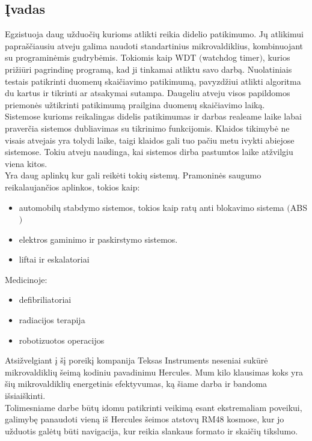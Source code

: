 \documentclass[a4paper, 12pt]{article} %
\begin{document}
\begin{onehalfspacing}

\section*{\k{I}vadas} %


Egzistuoja daug u\v{z}duo\v{c}i\k{u} kurioms atlikti reikia didelio patikimumo. J\k{u} atlikimui papra\v{s}\v{c}iausiu atveju galima naudoti standartinius mikrovaldiklius, kombinuojant su programin\.emis gudryb\.emis. Tokiomis kaip WDT $($watchdog timer$)$, kurios pri\v{z}i\=uri pagrindin\k{e} program\k{a}, kad ji tinkamai atliktu savo darb\k{a}. Nuolatiniais testais patikrinti duomen\k{u} skai\v{c}iavimo patikimum\k{a}, pavyzd\v{z}iui atlikti algoritma du kartus ir tikrinti ar atsakymai sutampa. Daugeliu atveju visos papildomos priemon\.es u\v{z}tikrinti patikimum\k{a} prailgina duomen\k{u} skai\v{c}iavimo laik\k{a}. \\
\indent Sistemose kurioms reikalingas didelis patikimumas ir darbas realeame laike labai praver\v{c}ia sistemos dubliavimas su tikrinimo funkcijomis. Klaidos tikimyb\.e ne visais atvejais yra tolydi laike, taigi klaidos gali tuo pa\v{c}iu metu ivykti abiejose sistemose. Tokiu atveju naudinga, kai sistemos dirba pastumtos laike at\v{z}vilgiu viena kitos. \\
\indent Yra daug aplink\k{u} kur gali reik\.eti toki\k{u} sistem\k{u}. Pramonin\.es saugumo reikalaujan\v{c}ios aplinkos, tokios kaip:
\begin{itemize}
\item automobil\k{u} stabdymo sistemos, tokios kaip rat\k{u} anti blokavimo sistema $($ABS$)$
\item elektros gaminimo ir paskirstymo sistemos.  
\item liftai ir eskalatoriai
\end{itemize}      
Medicinoje:
\begin{itemize}
\item defibriliatoriai
\item radiacijos terapija
\item robotizuotos operacijos
\end{itemize} 
\indent Atsi\v{z}velgiant \k{i} \v{s}\k{i} poreik\k{i} kompanija
 Teksas Instruments neseniai suk\={u}r\.e mikrovaldikli\k{u} \v{s}eim\k{a} 
 kodiniu pavadinimu Hercules. Mum kilo klausimas koks yra \v{s}i\k{u}
  mikrovaldikli\k{u} energetinis efektyvumas, k\k{a} \v{s}iame
   darba ir bandoma i\v{s}siai\v{s}kinti. \\
\indent Tolimesniame darbe b\=ut\k{u} idomu patikrinti veikim\k{a} esant ekstremaliam poveikui, galimyb\k{e} panaudoti vien\k{a} i\v{s} Hercules \v{s}eimos atstov\k{u} RM48 kosmose, kur jo u\v{z}duotis gal\.et\k{u} b\=uti navigacija, kur reikia slankaus formato ir skai\v{c}i\k{u} tikslumo.  


\end{onehalfspacing}
\end{document}
